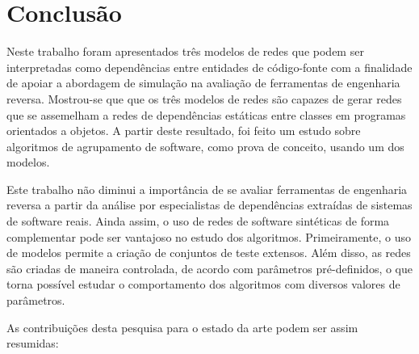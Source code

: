 

\chapter{Conclusão} \label{cap:conclusao}

Neste trabalho foram apresentados três modelos de redes que podem ser interpretadas como dependências entre entidades de código-fonte com a finalidade de apoiar a abordagem de simulação na avaliação de ferramentas de engenharia reversa. Mostrou-se que que os três modelos de redes são capazes de gerar redes que se assemelham a redes de dependências estáticas entre classes em programas orientados a objetos. A partir deste resultado, foi feito um estudo sobre algoritmos de agrupamento de software, como prova de conceito, usando um dos modelos.


Este trabalho não diminui a importância de se avaliar ferramentas de engenharia reversa a partir da análise por especialistas de dependências extraídas de sistemas de software reais. Ainda assim, o uso de redes de software sintéticas de forma complementar pode ser vantajoso no estudo dos algoritmos. Primeiramente, o uso de modelos permite a criação de conjuntos de teste extensos. Além disso, as redes são criadas de maneira controlada, de acordo com parâmetros pré-definidos, o que torna possível estudar o comportamento dos algoritmos com diversos valores de parâmetros.


As contribuições desta pesquisa para o estado da arte podem ser assim resumidas:

